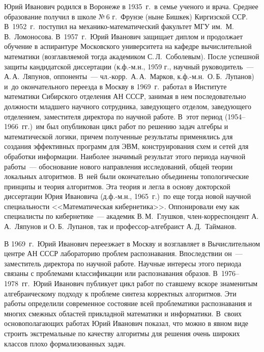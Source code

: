 Юрий Иванович родился в Воронеже в 1935~г.\ в семье ученого и врача. Среднее образование 
получил в школе №\,6 г.~Фрунзе (ныне Бишкек) Киргизской ССР. В~1952~г.\ поступил на 
ме\-ха\-ни\-ко-ма\-те\-ма\-ти\-че\-ский факультет МГУ им.\ М.\,В.~Ломоносова. В~1957~г.\ Юрий Иванович 
защищает диплом и продолжает обучение в аспирантуре Московского университета на кафедре 
вычислительной математики (возглавляемой тогда академиком С.\,Л.~Соболевым). После 
успешной защиты кандидатской диссертации (к.ф.-м.н., 1959 г., научный руководитель~--- 
А.\,А.~Ляпунов, оппоненты~--- чл.-корр.\ А.\,А.~Марков, к.ф.-м.н.\ О.\,Б.~Лупанов) и~до 
окончательного переезда в Москву в 1969~г.\ работал в Институте математики Сибирского 
отделения АН СССР, занимая в нем последовательно должности младшего научного сотрудника, 
заведующего отделом, заведующего отделением, заместителя директора по научной работе. 
В~этот период (1954--1966~гг.)\ им был опубликован цикл работ по решению задач алгебры и 
математической логики, причем полученные результаты применялись для создания эффективных 
программ для ЭВМ, конструирования схем и сетей для обработки информации. Наиболее значимый 
результат этого периода научной работы~--- обоснование нового направления исследований, 
общей теории локальных алгоритмов. В~ней были окончательно объединены топологические 
принципы и теория алгоритмов. Эта теория и легла в основу докторской диссертации Юрия 
Ивановича (д.ф.-м.н., 1965~г.)\ по еще тогда новой научной специальности <<Математическая 
кибернетика>>. Оппонировали ему как специалисты по кибернетике~--- академик 
В.\,М.~Глушков, член-корреспондент А.\,А.~Ляпунов и О.\,Б.~Лупанов, так и про\-фес\-сор-ал\-геб\-раист А.\,Д.~Тайманов. 

В 1969~г.\ Юрий Иванович переезжает в Москву и возглавляет в Вычислительном центре АН 
СССР лабораторию проблем распознавания. Впоследствии он~--- заместитель директора по 
научной работе. Научные интересы этого периода связаны с проблемами классификации или 
распознавания образов. В~1976--1978~гг.\ Юрий Иванович публикует цикл работ по ставшему 
вскоре знаменитым алгебраическому подходу к проблеме синтеза корректных алгоритмов. Эти 
работы определили современное состояние всей проблематики распознавания и многих смежных 
областей прикладной математики и информатики. В~своих основополагающих работах Юрий 
Иванович показал, что можно в явном виде строить экстремальные по качеству алгоритмы для 
решения очень широких классов плохо формализованных задач. 
{

}





